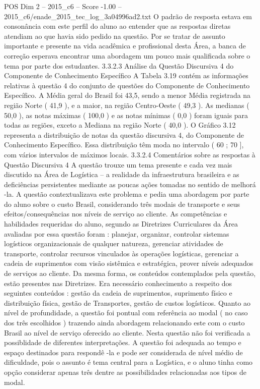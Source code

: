 \begin{textsample}{POS Dim 2 – 2015\_c6 – Score -1.00 – 2015\_c6/enade\_2015\_tec\_log\_3a04996ad2.txt}
O padrão de resposta estava em consonância com este perfil do aluno ao entender que as respostas diretas atendiam ao que havia sido pedido na questão.
Por se tratar de assunto importante e presente na vida acadêmica e profissional desta Área, a banca de correção esperava encontrar uma abordagem um pouco mais qualificada sobre o tema por parte dos estudantes. 3.3.2.3 Análise da Questão Discursiva 4 do Componente de Conhecimento Específico A Tabela 3.19 contém as informações relativas à questão 4 do conjunto de questões do Componente de Conhecimento Específico.
A Média geral do Brasil foi 43,5, sendo a menor Média registrada na região Norte ( 41,9 ), e a maior, na região Centro-Oeste ( 49,3 ).
As medianas ( 50,0 ), as notas máximas ( 100,0 ) e as notas mínimas ( 0,0 ) foram iguais para todas as regiões, exceto a Mediana na região Norte ( 40,0 ).
O Gráfico 3.12 representa a distribuição de notas da questão discursiva 4, do Componente de Conhecimento Específico.
Essa distribuição têm moda no intervalo ( 60 ; 70 ], com vários intervalos de máximos locais. 3.3.2.4 Comentários sobre as respostas à Questão Discursiva 4 A questão trouxe um tema presente e cada vez mais discutido na Área de Logística – a realidade da infraestrutura brasileira e as deficiências persistentes mediante as poucas ações tomadas no sentido de melhorá -la.
A questão contextualizava este problema e pedia uma abordagem por parte do aluno sobre o custo Brasil, considerando três modais de transporte e seus efeitos/consequências nos níveis de serviço ao cliente.
As competências e habilidades requeridas do aluno, segundo as Diretrizes Curriculares da Área avaliadas por essa questão foram : planejar, organizar, controlar sistemas logísticos organizacionais de qualquer natureza, gerenciar atividades de transporte, controlar recursos vinculados às operações logísticas, gerenciar a cadeia de suprimentos com visão sistêmica e estratégica, prover níveis adequados de serviços ao cliente.
Da mesma forma, os conteúdos contemplados pela questão, estão presentes nas Diretrizes.
Era necessário conhecimento a respeito dos seguintes conteúdos : gestão da cadeia de suprimentos, suprimento físico e distribuição física, gestão de Transportes, gestão de custos logísticos.
Quanto ao nível de profundidade, a questão foi pontual com referência ao modal ( no caso dos três escolhidos ) trazendo ainda abordagem relacionando este com o custo Brasil ao nível de serviço oferecido ao cliente.
Nesta questão não foi verificada a possiblidade de diferentes interpretações.
A questão foi adequada ao tempo e espaço destinados para respondê -la e pode ser considerada de nível médio de dificuldade, pois o assunto é tema central para a Logística, e o aluno tinha como opção considerar apenas três dentre as possibilidades relacionadas aos tipos de modal.

\end{textsample}
